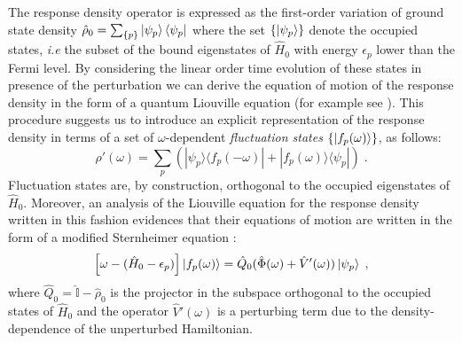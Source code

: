 \documentclass[reprint,aps,prb]{revtex4-1}
\newcommand{\eps}{\epsilon}
\newcommand{\be}{\begin{equation}}
\newcommand{\ee}{\end{equation}}
\newcommand{\lb}{\label}
\newcommand{\op}[1]{\hat {#1}}
\newcommand{\ketbra}[2]{| #1 \rangle \langle #2 |}
\newcommand{\dmnot}{\op{\rho}_0}
\newcommand{\dm}{\op{\rho}}
\newcommand{\hnot}{\op{H}_0}
\newcommand{\identity}{\op{\mathbb I}}
\begin{document}
The response density operator is expressed as the first-order variation of ground state density $\dmnot = \sum_{\{p\}} \ket{\psi_p} \bra{\psi_p}$
where the set $\{\ket{\psi_p}\}$ denote the occupied states, \emph{i.e} the subset of the bound eigenstates of $\hnot$ with energy $\eps_p$ lower than the Fermi level.
By considering the linear order time evolution of these states in presence of the perturbation we can derive the equation of motion of the response density in the form of 
a quantum Liouville equation (for example see \cite{baroni2008}). This procedure suggests us to introduce an explicit representation of the response density in terms of a set of 
$\omega$-dependent \emph{fluctuation states} $\{\ket{f_p(\omega)}\}$, as follows: 
\be\lb{rhoPrimeFluctuationStateDef1}
\dm'(\omega) = \sum_p\left(\ketbra{\psi_p}{f_p(-\omega)} + \ketbra{f_p(\omega)}{\psi_p}\right) \;.
\ee
Fluctuation states are, by construction, orthogonal to the occupied eigenstates of $\hnot$. Moreover, an analysis of the Liouville equation for the response density written in this fashion
evidences that their equations of motion are written in the form of a modified Sternheimer equation \cite{mahan1980}:
\be\lb{fluctuationStateEqMotion1}
\left[\omega - (\hnot-\eps_p)\right]\ket{f_p(\omega)} = \op Q_0(\op\Phi(\omega)+\op V'(\omega))\ket{\psi_p} \;,
\ee
where $\op Q_0=\identity-\dmnot$ is the projector in the subspace orthogonal to the occupied states of $\hnot$ and the operator $\op V'(\omega)$ is a perturbing term due to the density-dependence 
of the unperturbed Hamiltonian. %
\end{document}
